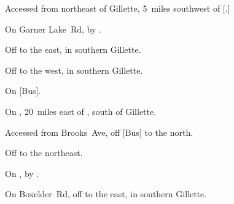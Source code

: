 
\begin{LocationList}

Accessed from  northeast of Gillette, 5~miles southwest of [.]

On Garner Lake~Rd, by  .

Off  to the east, in southern Gillette.

Off  to the west, in southern Gillette.

\Location{\GarageHQ \Garage}
On [Bus].

On , 20~miles east of , south of Gillette.

Accessed from Brooks~Ave, off [Bus]  to the north.

Off    to the northeast.

\Location{\TruckStop \Gas \Rest}
On , by  .

On Boxelder~Rd, off  to the east, in southern Gillette.

\end{LocationList}
